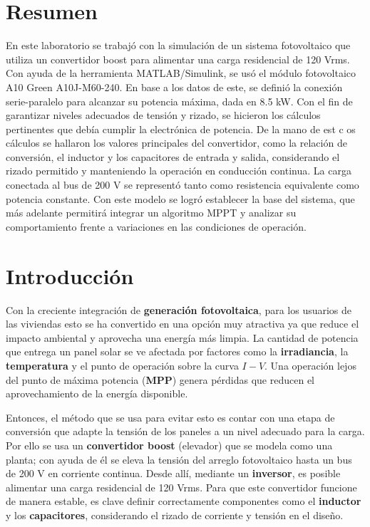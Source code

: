 \section{Resumen}
En este laboratorio se trabajó con la simulación de un sistema fotovoltaico que utiliza un convertidor boost para alimentar una carga residencial de 120 Vrms. Con ayuda de la herramienta MATLAB/Simulink, se usó el módulo fotovoltaico A10 Green A10J-M60-240. En base a los datos de este, se definió la conexión serie-paralelo para alcanzar su potencia máxima, dada en 8.5 kW. Con el fin de garantizar niveles adecuados de tensión y rizado, se hicieron los cálculos pertinentes que debía cumplir la electrónica de potencia. De la mano de est c    os cálculos se hallaron los valores principales del convertidor, como la relación de conversión, el inductor y los capacitores de entrada y salida, considerando el rizado permitido y manteniendo la operación en conducción continua. La carga conectada al bus de 200 V se representó tanto como resistencia equivalente como potencia constante. Con este modelo se logró establecer la base del sistema, que más adelante permitirá integrar un algoritmo MPPT y analizar su comportamiento frente a variaciones en las condiciones de operación.



\section{Introducción}
Con la creciente integración de \textbf{generación fotovoltaica}, para los usuarios de las viviendas esto se ha convertido en una opción muy atractiva ya que reduce el impacto ambiental y aprovecha una energía más limpia. La cantidad de potencia que entrega un panel solar se ve afectada por factores como la \textbf{irradiancia}, la \textbf{temperatura} y el punto de operación sobre la curva $I-V$. Una operación lejos del punto de máxima potencia (\textbf{MPP}) genera pérdidas que reducen el aprovechamiento de la energía disponible.

Entonces, el método que se usa para evitar esto es contar con una etapa de conversión que adapte la tensión de los paneles a un nivel adecuado para la carga. Por ello se usa un \textbf{convertidor boost} (elevador) que se modela como una planta; con ayuda de él se eleva la tensión del arreglo fotovoltaico hasta un bus de 200 V en corriente continua. Desde allí, mediante un \textbf{inversor}, es posible alimentar una carga residencial de 120 Vrms. Para que este convertidor funcione de manera estable, es clave definir correctamente componentes como el \textbf{inductor} y los \textbf{capacitores}, considerando el rizado de corriente y tensión en el diseño.

